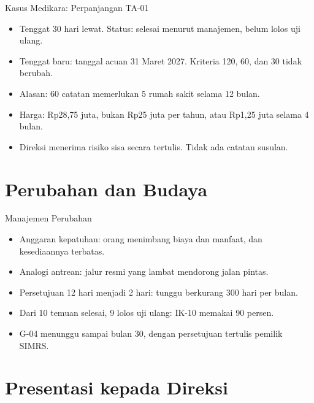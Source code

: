 \documentclass[aspectratio=169, table, 12pt]{beamer}
\begin{document}
\begin{frame}{{\Large Kasus Medikara: Perpanjangan TA-01}}
  \vspace{6pt}
  \small
  \begin{itemize}
    \item Tenggat 30 hari lewat. Status: selesai menurut manajemen, belum lolos uji ulang.
    \item Tenggat baru: tanggal acuan 31 Maret 2027. Kriteria 120, 60, dan 30 tidak berubah.
    \item Alasan: 60 catatan memerlukan 5 rumah sakit selama 12 bulan.
    \item Harga: Rp28,75 juta, bukan Rp25 juta per tahun, atau Rp1,25 juta selama 4 bulan.
    \item Direksi menerima risiko sisa secara tertulis. Tidak ada catatan susulan.
  \end{itemize}
\end{frame}

\section{Perubahan dan Budaya}

\begin{frame}{{\Large Manajemen Perubahan}}
  \vspace{6pt}
  \small
  \begin{itemize}
    \item Anggaran kepatuhan: orang menimbang biaya dan manfaat, dan kesediaannya terbatas.
    \item Analogi antrean: jalur resmi yang lambat mendorong jalan pintas.
    \item Persetujuan 12 hari menjadi 2 hari: tunggu berkurang 300 hari per bulan.
    \item Dari 10 temuan selesai, 9 lolos uji ulang: IK-10 memakai 90 persen.
    \item G-04 menunggu sampai bulan 30, dengan persetujuan tertulis pemilik SIMRS.
  \end{itemize}
\end{frame}

\section{Presentasi kepada Direksi}
\end{document}
